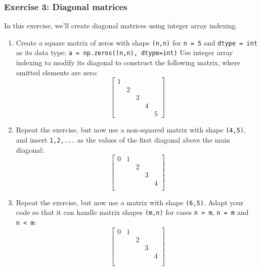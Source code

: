 \documentclass{scrartcl}
\begin{document}
    \hypertarget{exercise-3-diagonal-matrices}{%
\subsubsection{Exercise 3: Diagonal
matrices}\label{exercise-3-diagonal-matrices}}

In this exercise, we'll create diagonal matrices using integer array
indexing.

\begin{enumerate}
\def\labelenumi{\arabic{enumi}.}
\item
  Create a square matrix of zeros with shape \texttt{(n,n)} for
  \texttt{n\ =\ 5} and \texttt{dtype\ =\ int} as its data type:
  \texttt{a\ =\ np.zeros((n,n),\ dtype=int)} Use integer array indexing
  to modify its diagonal to construct the following matrix, where
  omitted elements are zero: \[
  \begin{bmatrix}
  1 &   &   &   & \\
    & 2 &   &   & \\
    &   & 3 &   & \\
    &   &   & 4 & \\
    &   &   &   & 5     
  \end{bmatrix}
  \]
\item
  Repeat the exercise, but now use a non-squared matrix with shape
  \texttt{(4,5)}, and insert \texttt{1,2,...} as the values of the first
  diagonal above the main diagonal: \[
  \begin{bmatrix}
   0 & 1 &   &   &   \\
   &   & 2 &   &   \\
   &   &   & 3 &   \\
   &   &   &   & 4 \\
  \end{bmatrix}
  \]
\item
  Repeat the exercise, but now use a matrix with shape \texttt{(6,5)}.
  Adapt your code so that it can handle matrix shapes \texttt{(m,n)} for
  cases \texttt{n\ \textgreater{}\ m}, \texttt{n\ =\ m} and
  \texttt{n\ \textless{}\ m}: \[
  \begin{bmatrix}
   0 & 1 &   &   &   \\
   &   & 2 &   &   \\
   &   &   & 3 &   \\
   &   &   &   & 4 \\
   &&&& \\
   &&&&
  \end{bmatrix}
  \]
\end{enumerate}
\end{document}
